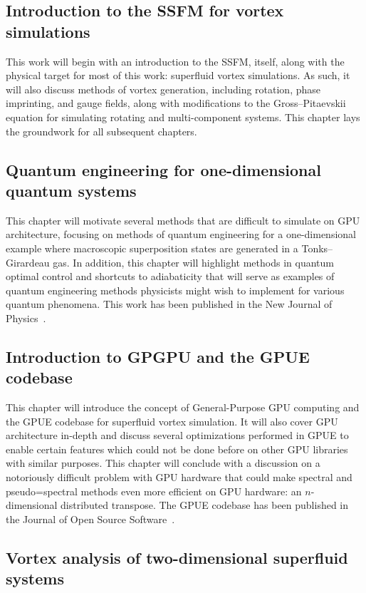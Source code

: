 \subsection*{Introduction to the SSFM for vortex simulations}

This work will begin with an introduction to the SSFM, itself, along with the physical target for most of this work: superfluid vortex simulations.
As such, it will also discuss methods of vortex generation, including rotation, phase imprinting, and gauge fields, along with modifications to the Gross--Pitaevskii equation for simulating rotating and multi-component systems.
This chapter lays the groundwork for all subsequent chapters.

\subsection*{Quantum engineering for one-dimensional quantum systems}

This chapter will motivate several methods that are difficult to simulate on GPU architecture, focusing on methods of quantum engineering for a one-dimensional example where macroscopic superposition states are generated in a Tonks--Girardeau gas.
In addition, this chapter will highlight methods in quantum optimal control and shortcuts to adiabaticity that will serve as examples of quantum engineering methods physicists might wish to implement for various quantum phenomena.
This work has been published in the New Journal of Physics~\cite{schloss2016}.


\subsection*{Introduction to GPGPU and the GPUE codebase}

This chapter will introduce the concept of General-Purpose GPU computing and the GPUE codebase for superfluid vortex simulation.
It will also cover GPU architecture in-depth and discuss several optimizations performed in GPUE to enable certain features which could not be done before on other GPU libraries with similar purposes.
This chapter will conclude with a discussion on a notoriously difficult problem with GPU hardware that could make spectral and pseudo=spectral methods even more efficient on GPU hardware: an $n$-dimensional distributed transpose.
The GPUE codebase has been published in the Journal of Open Source Software~\cite{schloss2018}.

\subsection*{Vortex analysis of two-dimensional superfluid systems}


